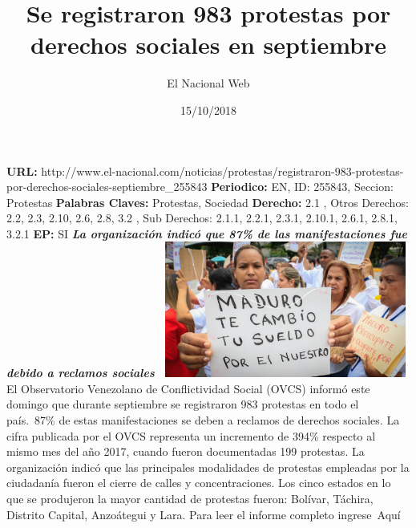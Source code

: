 \documentclass{article}%
\title{\textbf{Se registraron 983 protestas por derechos sociales en septiembre}}%
\author{El Nacional Web}%
\date{15/10/2018}%
\begin{document}
%
\normalsize%
\maketitle%
\textbf{URL: }%
http://www.el{-}nacional.com/noticias/protestas/registraron{-}983{-}protestas{-}por{-}derechos{-}sociales{-}septiembre\_255843\newline%
%
\textbf{Periodico: }%
EN, %
ID: %
255843, %
Seccion: %
Protestas\newline%
%
\textbf{Palabras Claves: }%
Protestas, Sociedad\newline%
%
\textbf{Derecho: }%
2.1%
, Otros Derechos: %
2.2, 2.3, 2.10, 2.6, 2.8, 3.2%
, Sub Derechos: %
2.1.1, 2.2.1, 2.3.1, 2.10.1, 2.6.1, 2.8.1, 3.2.1%
\newline%
%
\textbf{EP: }%
SI\newline%
\newline%
%
\textbf{\textit{La organización indicó que 87\% de las manifestaciones fue debido a reclamos sociales~}}%
\newline%
\newline%
%
\includegraphics[width=300px]{150.jpg}%
\newline%
%
El Observatorio Venezolano de Conflictividad Social (OVCS) informó este domingo que durante septiembre se registraron 983 protestas en todo el país.~87\% de estas manifestaciones se deben a reclamos de derechos sociales.%
\newline%
%
La cifra publicada por el OVCS representa un incremento de 394\% respecto al mismo mes del año 2017, cuando fueron documentadas 199 protestas.%
\newline%
%
La organización indicó que las principales modalidades de protestas empleadas por la ciudadanía fueron el cierre de calles y concentraciones.%
\newline%
%
Los cinco estados en lo que se produjeron la mayor cantidad de protestas fueron: Bolívar, Táchira, Distrito Capital, Anzoátegui y Lara.%
\newline%
%
Para leer el informe completo ingrese~Aquí%
\newline%
%
\end{document}
